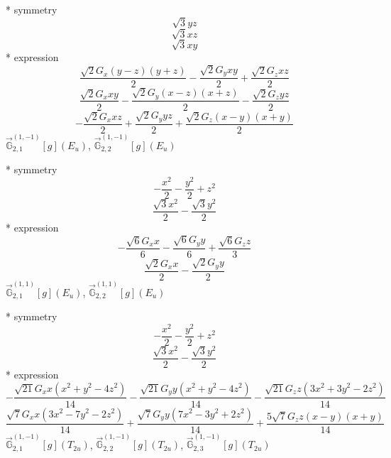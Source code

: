 \documentclass[fleqn,8pt]{jsarticle}
\begin{document}
\noindent\quad ** symmetry
\begin{dmath*}
\sqrt{3} y z
\end{dmath*}
\begin{dmath*}
\sqrt{3} x z
\end{dmath*}
\begin{dmath*}
\sqrt{3} x y
\end{dmath*}
\noindent\quad ** expression
\begin{dmath*}
\frac{\sqrt{2} G_{x} \left(y - z\right) \left(y + z\right)}{2} - \frac{\sqrt{2} G_{y} x y}{2} + \frac{\sqrt{2} G_{z} x z}{2}
\end{dmath*}
\begin{dmath*}
\frac{\sqrt{2} G_{x} x y}{2} - \frac{\sqrt{2} G_{y} \left(x - z\right) \left(x + z\right)}{2} - \frac{\sqrt{2} G_{z} y z}{2}
\end{dmath*}
\begin{dmath*}
- \frac{\sqrt{2} G_{x} x z}{2} + \frac{\sqrt{2} G_{y} y z}{2} + \frac{\sqrt{2} G_{z} \left(x - y\right) \left(x + y\right)}{2}
\end{dmath*}
\noindent\quad $\vec{\mathbb{G}}_{2,1}^{(1,-1)}[g](E_{u})$, $\vec{\mathbb{G}}_{2,2}^{(1,-1)}[g](E_{u})$

\noindent\quad ** symmetry
\begin{dmath*}
- \frac{x^{2}}{2} - \frac{y^{2}}{2} + z^{2}
\end{dmath*}
\begin{dmath*}
\frac{\sqrt{3} x^{2}}{2} - \frac{\sqrt{3} y^{2}}{2}
\end{dmath*}
\noindent\quad ** expression
\begin{dmath*}
- \frac{\sqrt{6} G_{x} x}{6} - \frac{\sqrt{6} G_{y} y}{6} + \frac{\sqrt{6} G_{z} z}{3}
\end{dmath*}
\begin{dmath*}
\frac{\sqrt{2} G_{x} x}{2} - \frac{\sqrt{2} G_{y} y}{2}
\end{dmath*}
\noindent\quad $\vec{\mathbb{G}}_{2,1}^{(1,1)}[g](E_{u})$, $\vec{\mathbb{G}}_{2,2}^{(1,1)}[g](E_{u})$

\noindent\quad ** symmetry
\begin{dmath*}
- \frac{x^{2}}{2} - \frac{y^{2}}{2} + z^{2}
\end{dmath*}
\begin{dmath*}
\frac{\sqrt{3} x^{2}}{2} - \frac{\sqrt{3} y^{2}}{2}
\end{dmath*}
\noindent\quad ** expression
\begin{dmath*}
- \frac{\sqrt{21} G_{x} x \left(x^{2} + y^{2} - 4 z^{2}\right)}{14} - \frac{\sqrt{21} G_{y} y \left(x^{2} + y^{2} - 4 z^{2}\right)}{14} - \frac{\sqrt{21} G_{z} z \left(3 x^{2} + 3 y^{2} - 2 z^{2}\right)}{14}
\end{dmath*}
\begin{dmath*}
\frac{\sqrt{7} G_{x} x \left(3 x^{2} - 7 y^{2} - 2 z^{2}\right)}{14} + \frac{\sqrt{7} G_{y} y \left(7 x^{2} - 3 y^{2} + 2 z^{2}\right)}{14} + \frac{5 \sqrt{7} G_{z} z \left(x - y\right) \left(x + y\right)}{14}
\end{dmath*}
\noindent\quad $\vec{\mathbb{G}}_{2,1}^{(1,-1)}[g](T_{2u})$, $\vec{\mathbb{G}}_{2,2}^{(1,-1)}[g](T_{2u})$, $\vec{\mathbb{G}}_{2,3}^{(1,-1)}[g](T_{2u})$
\end{document}
